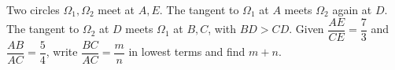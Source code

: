 Two circles $\Omega_1,\Omega_2$ meet at $A,E$. The tangent to $\Omega_1$ at $A$ meets $\Omega_2$ again at $D$. The tangent to $\Omega_2$ at $D$ meets $\Omega_1$ at $B,C$, with $BD>CD$. Given $\dfrac{AE}{CE}=\dfrac{7}{3}$ and $\dfrac{AB}{AC}=\dfrac{5}{4}$, write $\dfrac{BC}{AC}=\dfrac{m}{n}$ in lowest terms and find $m+n$.
